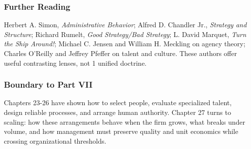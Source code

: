 \subsubsection*{Further Reading}

Herbert A. Simon, \textit{Administrative Behavior}; Alfred D. Chandler Jr., \textit{Strategy and Structure}; Richard Rumelt, \textit{Good Strategy/Bad Strategy}; L. David Marquet, \textit{Turn the Ship Around!}; Michael C. Jensen and William H. Meckling on agency theory; Charles O'Reilly and Jeffrey Pfeffer on talent and culture. These authors offer useful contrasting lenses, not 1 unified doctrine.

\subsubsection*{Boundary to Part VII}

Chapters 23-26 have shown how to select people, evaluate specialized talent, design reliable processes, and arrange human authority. Chapter 27 turns to scaling: how these arrangements behave when the firm grows, what breaks under volume, and how management must preserve quality and unit economics while crossing organizational thresholds.
